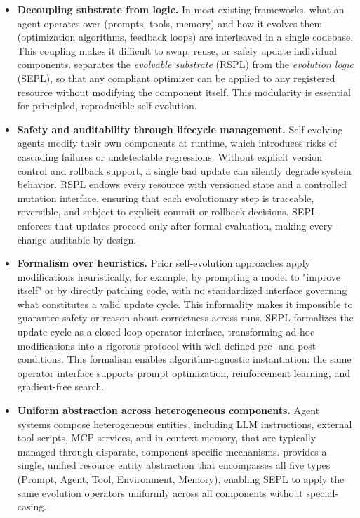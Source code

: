 \begin{itemize}[leftmargin=*]
    \item \textbf{Decoupling substrate from logic.} In most existing frameworks, what an agent operates over (prompts, tools, memory) and how it evolves them (optimization algorithms, feedback loops) are interleaved in a single codebase. This coupling makes it difficult to swap, reuse, or safely update individual components. \projectname separates the \emph{evolvable substrate} (RSPL) from the \emph{evolution logic} (SEPL), so that any compliant optimizer can be applied to any registered resource without modifying the component itself. This modularity is essential for principled, reproducible self-evolution.

    \item \textbf{Safety and auditability through lifecycle management.} Self-evolving agents modify their own components at runtime, which introduces risks of cascading failures or undetectable regressions. Without explicit version control and rollback support, a single bad update can silently degrade system behavior. RSPL endows every resource with versioned state and a controlled mutation interface, ensuring that each evolutionary step is traceable, reversible, and subject to explicit commit or rollback decisions. SEPL enforces that updates proceed only after formal evaluation, making every change auditable by design.

    \item \textbf{Formalism over heuristics.} Prior self-evolution approaches apply modifications heuristically, for example, by prompting a model to "improve itself" or by directly patching code, with no standardized interface governing what constitutes a valid update cycle. This informality makes it impossible to guarantee safety or reason about correctness across runs. SEPL formalizes the update cycle as a closed-loop operator interface, transforming ad hoc modifications into a rigorous protocol with well-defined pre- and post-conditions. This formalism enables algorithm-agnostic instantiation: the same operator interface supports prompt optimization, reinforcement learning, and gradient-free search.

    \item \textbf{Uniform abstraction across heterogeneous components.} Agent systems compose heterogeneous entities, including LLM instructions, external tool scripts, MCP services, and in-context memory, that are typically managed through disparate, component-specific mechanisms. \projectname provides a single, unified resource entity abstraction that encompasses all five types (Prompt, Agent, Tool, Environment, Memory), enabling SEPL to apply the same evolution operators uniformly across all components without special-casing.
\end{itemize}

